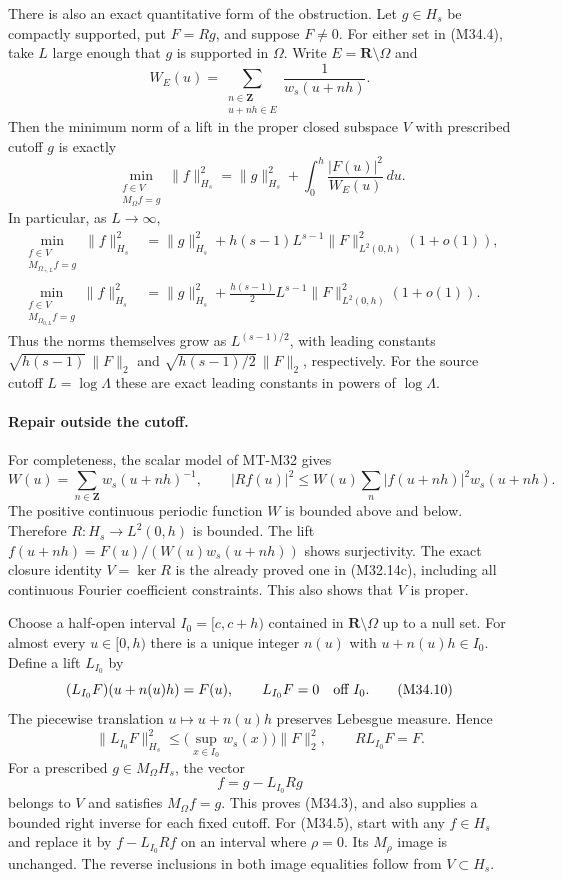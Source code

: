 There is also an exact quantitative form of the obstruction.
Let $g\in H_s$ be compactly supported, put $F=Rg$, and
suppose $F\ne0$.  For either set in (M34.4), take $L$
large enough that $g$ is supported in $\Omega$.  Write
$E=\mathbf R\setminus\Omega$ and
\[
 W_E(u)=\sum_{\substack{n\in\mathbf Z\\u+nh\in E}}
                   \frac1{w_s(u+nh)}.
 \tag{M34.6}
\]
Then the minimum norm of a lift in the proper closed
subspace $V$ with prescribed cutoff $g$ is exactly
\[
 \min_{\substack{f\in V\\M_\Omega f=g}}\|f\|_{H_s}^2
       =\|g\|_{H_s}^2+
                      \int_0^h\frac{|F(u)|^2}{W_E(u)}\,du.
 \tag{M34.7}
\]
In particular, as $L\to\infty$,
\[
 \begin{split}
 \min_{\substack{f\in V\\M_{\Omega_{+,L}}f=g}}
                 \|f\|_{H_s}^2
  &=\|g\|_{H_s}^2+
        h(s-1)L^{s-1}\|F\|_{L^2(0,h)}^2(1+o(1)),\\
 \min_{\substack{f\in V\\M_{\Omega_{0,L}}f=g}}
                 \|f\|_{H_s}^2
  &=\|g\|_{H_s}^2+
       \frac{h(s-1)}2L^{s-1}\|F\|_{L^2(0,h)}^2(1+o(1)).
 \end{split}
 \tag{M34.8}
\]
Thus the norms themselves grow as $L^{(s-1)/2}$,
with leading constants $\sqrt{h(s-1)}\,\|F\|_2$
and $\sqrt{h(s-1)/2}\,\|F\|_2$, respectively.
For the source cutoff $L=\log\Lambda$ these are exact
leading constants in powers of $\log\Lambda$.

\paragraph{Repair outside the cutoff.}
For completeness, the scalar model of MT-M32 gives
\[
 W(u)=\sum_{n\in\mathbf Z}w_s(u+nh)^{-1},\qquad
 |Rf(u)|^2\le W(u)\sum_n|f(u+nh)|^2w_s(u+nh).
 \tag{M34.9}
\]
The positive continuous periodic function $W$ is bounded
above and below.  Therefore $R:H_s\to L^2(0,h)$ is
bounded.  The lift $f(u+nh)=F(u)/(W(u)w_s(u+nh))$
shows surjectivity.  The exact closure identity $V=\ker R$
is the already proved one in (M32.14c), including all
continuous Fourier coefficient constraints.  This also
shows that $V$ is proper.

Choose a half-open interval $I_0=[c,c+h)$ contained in
$\mathbf R\setminus\Omega$ up to a null set.  For almost
every $u\in[0,h)$ there is a unique integer $n(u)$ with
$u+n(u)h\in I_0$.  Define a lift $L_{I_0}$ by
\[
 (L_{I_0}F)(u+n(u)h)=F(u),\qquad
 L_{I_0}F=0\quad\hbox{off }I_0.
 \tag{M34.10}
\]
The piecewise translation $u\mapsto u+n(u)h$ preserves
Lebesgue measure.  Hence
\[
 \|L_{I_0}F\|_{H_s}^2
       \le\bigl(\sup_{x\in I_0}w_s(x)\bigr)\|F\|_2^2,
 \qquad R L_{I_0}F=F.
 \tag{M34.11}
\]
For a prescribed $g\in M_\Omega H_s$, the vector
\[
                        f=g-L_{I_0}Rg
 \tag{M34.12}
\]
belongs to $V$ and satisfies $M_\Omega f=g$.  This proves
(M34.3), and also supplies a bounded right inverse for each
fixed cutoff.  For (M34.5), start with any $f\in H_s$ and
replace it by $f-L_{I_0}Rf$ on an interval where $\rho=0$.
Its $M_\rho$ image is unchanged.  The reverse inclusions
in both image equalities follow from $V\subset H_s$.

